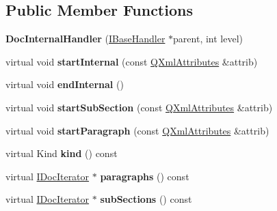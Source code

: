 \subsection*{Public Member Functions}
\begin{DoxyCompactItemize}
\item 
\mbox{\label{class_doc_internal_handler_a427a5ae98fdbbca2c01cd591b8ef0cf4}} 
{\bfseries Doc\+Internal\+Handler} (\mbox{\hyperlink{class_i_base_handler}{I\+Base\+Handler}} $\ast$parent, int level)
\item 
\mbox{\label{class_doc_internal_handler_af41ed4390babd870c4e111544226284c}} 
virtual void {\bfseries start\+Internal} (const \mbox{\hyperlink{class_q_xml_attributes}{Q\+Xml\+Attributes}} \&attrib)
\item 
\mbox{\label{class_doc_internal_handler_aaff500a74479fff6bbbd398b90d69e69}} 
virtual void {\bfseries end\+Internal} ()
\item 
\mbox{\label{class_doc_internal_handler_af51a9a54d3d5d53100648239f08aa013}} 
virtual void {\bfseries start\+Sub\+Section} (const \mbox{\hyperlink{class_q_xml_attributes}{Q\+Xml\+Attributes}} \&attrib)
\item 
\mbox{\label{class_doc_internal_handler_a7ed05a39b8e15ed7c73bf9b4d7070146}} 
virtual void {\bfseries start\+Paragraph} (const \mbox{\hyperlink{class_q_xml_attributes}{Q\+Xml\+Attributes}} \&attrib)
\item 
\mbox{\label{class_doc_internal_handler_a0b96fb24d952d336cbf5de62f62f851b}} 
virtual Kind {\bfseries kind} () const
\item 
\mbox{\label{class_doc_internal_handler_a77964a7e9934287fdec3f7a5a636c3f4}} 
virtual \mbox{\hyperlink{class_i_doc_iterator}{I\+Doc\+Iterator}} $\ast$ {\bfseries paragraphs} () const
\item 
\mbox{\label{class_doc_internal_handler_ad91c34db96ac8c77d10f512d5f2c60e5}} 
virtual \mbox{\hyperlink{class_i_doc_iterator}{I\+Doc\+Iterator}} $\ast$ {\bfseries sub\+Sections} () const
\end{DoxyCompactItemize}
